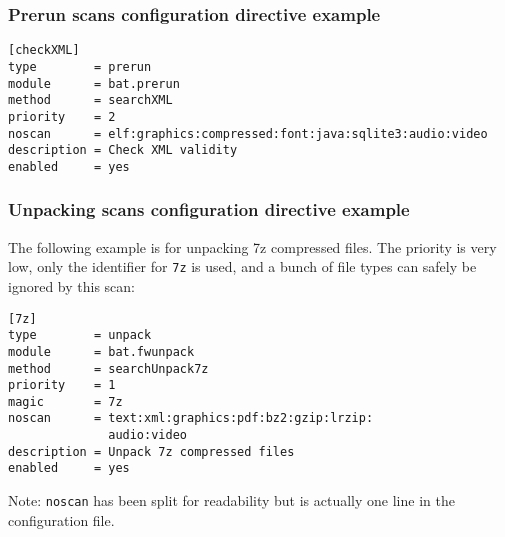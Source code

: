 \documentclass[11pt]{beamer}
\begin{document}

\begin{frame}[fragile]
\frametitle{Prerun scans configuration directive example}

\begin{verbatim}
[checkXML]
type        = prerun
module      = bat.prerun
method      = searchXML
priority    = 2
noscan      = elf:graphics:compressed:font:java:sqlite3:audio:video
description = Check XML validity
enabled     = yes
\end{verbatim}

\end{frame}

\begin{frame}[fragile]
\frametitle{Unpacking scans configuration directive example}

The following example is for unpacking 7z compressed files. The priority is very low, only the identifier for \texttt{7z} is used, and a bunch of file types can safely be ignored by this scan:

\begin{verbatim}
[7z]
type        = unpack
module      = bat.fwunpack
method      = searchUnpack7z
priority    = 1
magic       = 7z
noscan      = text:xml:graphics:pdf:bz2:gzip:lrzip:
              audio:video
description = Unpack 7z compressed files
enabled     = yes
\end{verbatim}

Note: \texttt{noscan} has been split for readability but is actually one line in the configuration file.
\end{frame}
\end{document}

